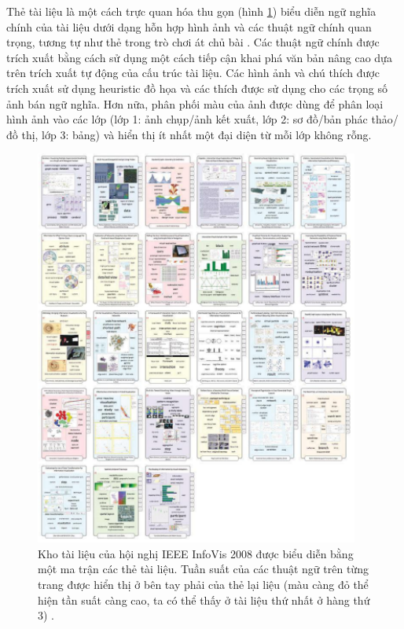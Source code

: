 \documentclass[14pt, a4paper]{article}
\numberwithin{equation}{section}
\numberwithin{figure}{section}
\numberwithin{dl}{section}
\numberwithin{md}{section}
\numberwithin{bd}{section}
\numberwithin{dn}{section}
\numberwithin{hq}{section}
\begin{document}
    Thẻ tài liệu là một cách trực quan hóa thu gọn (hình \ref{fig:12}) biểu diễn ngữ nghĩa chính của tài liệu dưới dạng hỗn hợp hình ảnh và các thuật ngữ chính quan trọng, tương tự như thẻ trong trò chơi át chủ bài \cite{400}.
    Các thuật ngữ chính được trích xuất bằng cách sử dụng một cách tiếp cận khai phá văn bản nâng cao dựa trên trích xuất tự động của cấu trúc tài liệu.
    Các hình ảnh và chú thích được trích xuất sử dụng heuristic đồ họa và các thích được sử dụng cho các trọng số ảnh bán ngữ nghĩa.
    Hơn nữa, phân phối màu của ảnh được dùng để phân loại hình ảnh vào các lớp (lớp 1: ảnh chụp/ảnh kết xuất, lớp 2: sơ đồ/bản phác thảo/đồ thị, lớp 3: bảng) và hiển thị ít nhất một đại diện từ mỗi lớp không rỗng.

    \begin{figure}[h!]
        \centering
        \includegraphics[width=0.95\textwidth]{12.png}
        \caption{Kho tài liệu của hội nghị IEEE InfoVis 2008 được biểu diễn bằng một ma trận các thẻ tài liệu.
        Tuần suất của các thuật ngữ trên từng trang được hiển thị ở bên tay phải của thẻ lại liệu (màu càng đỏ thể hiện tần suất càng cao, ta có thể thấy ở tài liệu thứ nhất ở hàng thứ 3) \cite{400}.}
        \label{fig:12}
    \end{figure}
\end{document}
